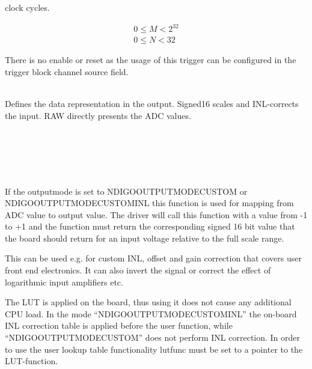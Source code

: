 			clock cycles.
			
			\begin{align}
				0 \leq M < 2^{32}\\
				0 \leq N < 32
			\end{align}					
		
			There is no enable or reset as the usage of this trigger can be configured in the trigger block channel source field.\par

			\\
			Defines the data representation in the output. Signed16 scales and INL-corrects the input. RAW directly presents the ADC values.\par
			
			\\
			\\
			\\
			\par
			
			\\
			If the \textsf{output\tu mode} is set to \textsf{NDIGO\tu OUTPUT\tu MODE\tu CUSTOM} or\\\textsf{NDIGO\tu OUTPUT\tu MODE\tu CUSTOM\tu INL} this function is used for mapping from ADC value to output value. The driver will call this function with a value from -1 to +1 and the function must return the corresponding signed 16 bit value that the board should return for an input voltage relative to the full scale range.\par

			 \par

			This can be used e.g. for custom INL, offset and gain correction that covers user front end electronics. It can also invert the signal or correct the effect of logarithmic input amplifiers etc.\par
			
			The LUT is applied on the board, thus using it does not cause any additional CPU load. In the mode ``\textsf{NDIGO\tu OUTPUT\tu MODE\tu CUSTOM\tu INL}'' the on-board INL correction table is applied before the user function, while ``\textsf{NDIGO\tu OUTPUT\tu MODE\tu CUSTOM}'' does not perform INL correction. In order to use the user lookup table functionality \textsf{lut\tu func} must be set to a pointer to the LUT-function.
		
